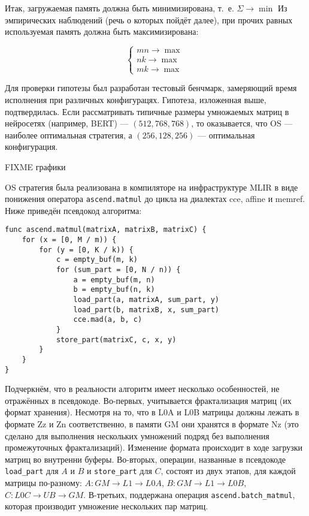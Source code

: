 Итак, загружаемая память должна быть минимизирована, т.~е. $\Sigma \rightarrow \min$
Из эмпирических наблюдений (речь о которых пойдёт далее), при прочих равных используемая
память должна быть максимизирована:

\[
\begin{cases}
    mn \rightarrow \max \\
    nk \rightarrow \max \\
    mk \rightarrow \max
\end{cases}
\]

Для проверки гипотезы был разработан тестовый бенчмарк, замеряющий время
исполнения при различных конфигурацях. Гипотеза, изложенная выше, подтвердилась.
Если рассматривать типичные размеры умножаемых матриц в нейросетях (например,
BERT) --- $(512, 768, 768)$, то оказывается, что OS --- наиболее оптимальная
стратегия, а $(256, 128, 256)$ --- оптимальная конфигурация.

FIXME графики

OS стратегия была реализована в компиляторе на инфраструктуре MLIR в виде
понижения оператора \texttt{ascend.matmul} до цикла на диалектах cce,
affine и memref. Ниже приведён псевдокод алгоритма:

\begin{lstlisting}
func ascend.matmul(matrixA, matrixB, matrixC) {
    for (x = [0, M / m)) {
        for (y = [0, K / k)) {
            c = empty_buf(m, k)
            for (sum_part = [0, N / n)) {
                a = empty_buf(m, n)
                b = empty_buf(n, k)
                load_part(a, matrixA, sum_part, y)
                load_part(b, matrixB, x, sum_part)
                cce.mad(a, b, c)
            }
            store_part(matrixC, c, x, y)
        }
    }
}
\end{lstlisting}

Подчеркнём, что в реальности алгоритм имеет несколько особенностей, не
отражённых в псевдокоде. Во-первых, учитывается фрактализация матриц (их формат
хранения). Несмотря на то, что в L0A и L0B матрицы должны лежать в формате Zz и Zn
соответственно, в памяти GM они хранятся в формате Nz (это сделано для выполнения
нескольких умножений подряд без выполнения промежуточных фрактализаций). Изменение
формата происходит в ходе загрузки матриц во внутренни буферы. Во-вторых,
операции, названные в псевдокоде \texttt{load\_part} для $A$ и $B$ и \texttt{store\_part}
для $C$, состоят из двух этапов, для каждой матрицы по-разному:
$A: GM \rightarrow L1 \rightarrow L0A$, $B: GM \rightarrow L1 \rightarrow L0B$,
$C: L0C \rightarrow UB \rightarrow GM$. В-третьих, поддержана операция
\texttt{ascend.batch\_matmul}, которая производит умножение нескольких пар матриц.

